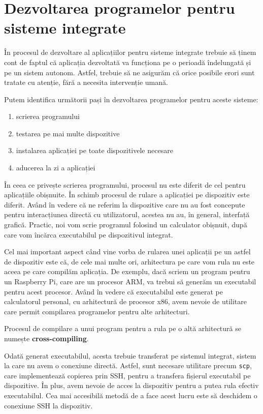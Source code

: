 \section{Dezvoltarea programelor pentru sisteme integrate}
\label{sec:embed:dev}

În procesul de dezvoltare al aplicațiilor pentru sisteme integrate trebuie să
ținem cont de faptul că aplicația dezvoltată va funcționa pe o perioadă
îndelungată și pe un sistem autonom. Astfel, trebuie să ne asigurăm că orice
posibile erori sunt tratate cu atenție, fără a necesita intervenție umană.

Putem identifica următorii pași în dezvoltarea programelor pentru aceste
sisteme:

\begin{enumerate}
  \item scrierea programului
  \item testarea pe mai multe dispozitive
  \item instalarea aplicației pe toate dispozitivele necesare
  \item aducerea la zi a aplicației
\end{enumerate}

În ceea ce privește scrierea programului, procesul nu este diferit de cel pentru
aplicațiile obișnuite. În schimb procesul de rulare a aplicației pe dispozitiv
este diferit. Având în vedere că ne referim la dispozitive care nu au fost
concepute pentru interacțiunea directă cu utilizatorul, acestea nu au, în general,
interfață grafică. Practic, noi vom scrie programul folosind un calculator
obișnuit, după care vom încărca executabilul pe dispozitivul integrat.

Cel mai important aspect când vine vorba de rularea unei aplicații pe un astfel
de dispozitiv este că, de cele mai multe ori, arhitectura pe care vom rula nu este
aceea pe care compilăm aplicația. De exemplu, dacă scriem un program pentru un
Raspberry Pi, care are un procesor ARM, va trebui să generăm un executabil
pentru acest procesor. Având în vedere că executabilul este generat pe
calculatorul personal, cu arhitectură de procesor x86, avem nevoie de utilitare care permit
compilarea programelor pentru alte arhitecturi.

Procesul de compilare a unui program pentru a rula pe o altă arhitectură se
numește \textbf{cross-compiling}.

Odată generat executabilul, acesta trebuie transferat pe sistemul integrat,
sistem la care nu avem o conexiune directă. Astfel, sunt necesare utilitare
precum \texttt{scp}, care implementează copierea prin SSH, pentru a transfera fișierul executabil pe dispozitive. În plus, avem
nevoie de acces la dispozitiv pentru a putea rula efectiv executabilul. Cea mai
accesibilă metodă de a face acest lucru este să deschidem o conexiune SSH la
dispozitiv.

